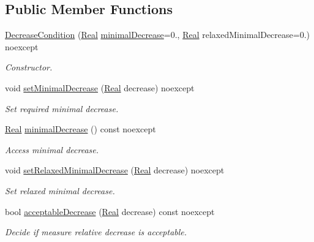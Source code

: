 \subsection*{Public Member Functions}
\begin{DoxyCompactItemize}
\item 
\hyperlink{classSpacy_1_1Mixin_1_1DecreaseCondition_abc3d63e53f4f7a81110a3b261e12c071_abc3d63e53f4f7a81110a3b261e12c071}{Decrease\+Condition} (\hyperlink{classSpacy_1_1Real}{Real} \hyperlink{classSpacy_1_1Mixin_1_1DecreaseCondition_aeeda8b1d9f177fe5dd532e42de09ab44_aeeda8b1d9f177fe5dd532e42de09ab44}{minimal\+Decrease}=0., \hyperlink{classSpacy_1_1Real}{Real} relaxed\+Minimal\+Decrease=0.) noexcept
\begin{DoxyCompactList}\small\item\em Constructor. \end{DoxyCompactList}\item 
void \hyperlink{classSpacy_1_1Mixin_1_1DecreaseCondition_aabc5e2473edace0c87da7fbd9fa0ae61_aabc5e2473edace0c87da7fbd9fa0ae61}{set\+Minimal\+Decrease} (\hyperlink{classSpacy_1_1Real}{Real} decrease) noexcept
\begin{DoxyCompactList}\small\item\em Set required minimal decrease. \end{DoxyCompactList}\item 
\hyperlink{classSpacy_1_1Real}{Real} \hyperlink{classSpacy_1_1Mixin_1_1DecreaseCondition_aeeda8b1d9f177fe5dd532e42de09ab44_aeeda8b1d9f177fe5dd532e42de09ab44}{minimal\+Decrease} () const noexcept
\begin{DoxyCompactList}\small\item\em Access minimal decrease. \end{DoxyCompactList}\item 
void \hyperlink{classSpacy_1_1Mixin_1_1DecreaseCondition_a86d6a8c8fc683c31572fd818a102a362_a86d6a8c8fc683c31572fd818a102a362}{set\+Relaxed\+Minimal\+Decrease} (\hyperlink{classSpacy_1_1Real}{Real} decrease) noexcept
\begin{DoxyCompactList}\small\item\em Set relaxed minimal decrease. \end{DoxyCompactList}\item 
bool \hyperlink{classSpacy_1_1Mixin_1_1DecreaseCondition_a69c0c90daf14fc40461876f71c49ffc2_a69c0c90daf14fc40461876f71c49ffc2}{acceptable\+Decrease} (\hyperlink{classSpacy_1_1Real}{Real} decrease) const noexcept
\begin{DoxyCompactList}\small\item\em Decide if measure relative decrease is acceptable. \end{DoxyCompactList}\item 

\end{DoxyCompactItemize}
